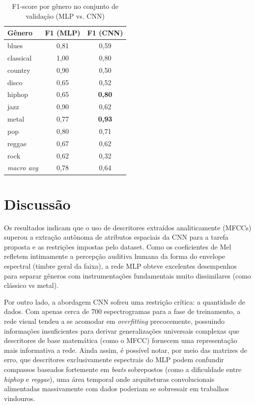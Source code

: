 \documentclass[conference]{IEEEtran}
\begin{document}
	\begin{table}[h]
		\centering
		\caption{F1-score por gênero no conjunto de validação (MLP vs. CNN)}
		\label{tab:f1_genero}
		\begin{tabular}{lcc}
			\toprule
			\textbf{Gênero} & \textbf{F1 (MLP)} & \textbf{F1 (CNN)} \\
			\midrule
			blues     & 0,81 & 0,59 \\
			classical & 1,00 & 0,80 \\
			country   & 0,90 & 0,50 \\
			disco     & 0,65 & 0,52 \\
			hiphop    & 0,65 & \textbf{0,80} \\
			jazz      & 0,90 & 0,62 \\
			metal     & 0,77 & \textbf{0,93} \\
			pop       & 0,80 & 0,71 \\
			reggae    & 0,67 & 0,62 \\
			rock      & 0,62 & 0,32 \\
			\midrule
			\textit{macro avg} & 0,78 & 0,64 \\
			\bottomrule
		\end{tabular}
	\end{table}
	
	\section{Discussão}
	Os resultados indicam que o uso de descritores extraídos analiticamente (MFCCs) superou a extração autônoma de atributos espaciais da CNN para a tarefa proposta e as restrições impostas pelo dataset. Como os coeficientes de Mel refletem intimamente a percepção auditiva humana da forma do envelope espectral (timbre geral da faixa), a rede MLP obteve excelentes desempenhos para separar gêneros com instrumentações fundamentais muito dissimilares (como clássico vs metal).
	
	Por outro lado, a abordagem CNN sofreu uma restrição crítica: a quantidade de dados. Com apenas cerca de 700 espectrogramas para a fase de treinamento, a rede visual tendeu a se acomodar em \textit{overfitting} precocemente, possuindo informações insuficientes para derivar generalizações universais complexas que descritores de base matemática (como o MFCC) fornecem uma representação mais informativa a rede. Ainda assim, é possível notar, por meio das matrizes de erro, que descritores exclusivamente espectrais do MLP podem confundir compassos baseados fortemente em \textit{beats} sobrepostos (como a dificuldade entre \textit{hiphop} e \textit{reggae}), uma área temporal onde arquiteturas convolucionais alimentadas massivamente com dados poderiam se sobressair em trabalhos vindouros.
	
\end{document}
